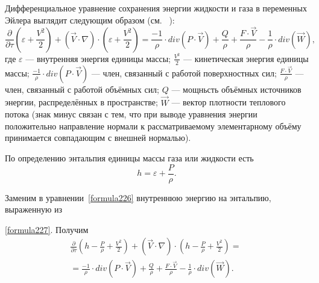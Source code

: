 
\label{sec:subsection23}
Дифференциальное уравнение сохранения энергии жидкости и газа в переменных Эйлера выглядит следующим образом (см. ~\cite{Samarsky}):
\begin{equation}
\label{formula226}
\frac{\partial}{\partial\tau}\left(\varepsilon+\frac{V^2}{2} \right) + (\vec{V} \cdot \nabla) \cdot \left(\varepsilon+\frac{V^2}{2} \right) = \frac{-1}{\rho}\cdot div(P\cdot\vec{V}) + \frac Q \rho + \frac{F\cdot\vec{V}}{\rho}-\frac 1 \rho \cdot div(\vec{W}),
\end{equation}
где $\varepsilon$ --- внутренняя энергия единицы массы; $\frac{V^2}{2}$ --- кинетическая энергия единицы массы; $\frac{-1}{\rho}\cdot div(P\cdot\vec{V})$ --- член, связанный с работой поверхностных сил; $\frac{F\cdot\vec{V}}{\rho}$ --- член, связанный с работой объёмных сил; $Q$ --- мощньсть объёмных источников энергии, распределённых в пространстве; $\vec{W}$ --- вектор плотности теплового потока (знак минус связан с тем, что при выводе уравнения энергии положительно направление нормали к рассматриваемому элементарному объёму принимается совпадающим с внешней нормалью). 

По определению энтальпия единицы массы газа или жидкости есть 
\begin{equation}
\label{formula227}
h = \varepsilon + \frac P \rho.
\end{equation}

Заменим в уравнении~\eqref{formula226} внутреннюю энергию на энтальпию, выраженную из

\noindent \eqref{formula227}. Получим 
\begin{eqnarray}
\label{formula228}
\frac{\partial}{\partial\tau}\left(h-\frac P \rho + \frac{V^2}{2} \right) + (\vec{V} \cdot \nabla) \cdot \left(h-\frac P \rho + \frac{V^2}{2} \right) = \nonumber ~\\
= \frac{-1}{\rho}\cdot div(P\cdot\vec{V}) + \frac Q \rho + \frac{F\cdot\vec{V}}{\rho}-\frac 1 \rho \cdot div(\vec{W}).
\end{eqnarray} 

